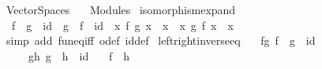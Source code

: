 %
\begin{isabellebody}%
%
%
\isadelimdocument
%
\endisadelimdocument
%
\isatagdocument
%
\isamarkuptrue%
%
\endisatagdocument
{\isafolddocument}%
%
\isadelimdocument
%
\endisadelimdocument
%
\isadelimtheory
%
\endisadelimtheory
%
\isatagtheory
{}\isamarkupfalse%
\ Vector{\isacharunderscore}{\kern0pt}Spaces\isanewline
\ \ \ Modules\isanewline
{}%
\endisatagtheory
{\isafoldtheory}%
%
\isadelimtheory
\isanewline
%
\endisadelimtheory
\isanewline
{}\isamarkupfalse%
\ isomorphism{\isacharunderscore}{\kern0pt}expand{\isacharcolon}{\kern0pt}\isanewline
\ \ {\isachardoublequoteopen}f\ {\isasymcirc}\ g\ {\isacharequal}{\kern0pt}\ id\ {\isasymand}\ g\ {\isasymcirc}\ f\ {\isacharequal}{\kern0pt}\ id\ {\isasymlongleftrightarrow}\ {\isacharparenleft}{\kern0pt}{\isasymforall}x{\isachardot}{\kern0pt}\ f\ {\isacharparenleft}{\kern0pt}g\ x{\isacharparenright}{\kern0pt}\ {\isacharequal}{\kern0pt}\ x{\isacharparenright}{\kern0pt}\ {\isasymand}\ {\isacharparenleft}{\kern0pt}{\isasymforall}x{\isachardot}{\kern0pt}\ g\ {\isacharparenleft}{\kern0pt}f\ x{\isacharparenright}{\kern0pt}\ {\isacharequal}{\kern0pt}\ x{\isacharparenright}{\kern0pt}{\isachardoublequoteclose}\isanewline
%
\isadelimproof
\ \ %
\endisadelimproof
%
\isatagproof
{}\isamarkupfalse%
\ {\isacharparenleft}{\kern0pt}simp\ add{\isacharcolon}{\kern0pt}\ fun{\isacharunderscore}{\kern0pt}eq{\isacharunderscore}{\kern0pt}iff\ o{\isacharunderscore}{\kern0pt}def\ id{\isacharunderscore}{\kern0pt}def{\isacharparenright}{\kern0pt}%
\endisatagproof
{\isafoldproof}%
%
\isadelimproof
\isanewline
%
\endisadelimproof
\isanewline
{}\isamarkupfalse%
\ left{\isacharunderscore}{\kern0pt}right{\isacharunderscore}{\kern0pt}inverse{\isacharunderscore}{\kern0pt}eq{\isacharcolon}{\kern0pt}\isanewline
\ \ \ fg{\isacharcolon}{\kern0pt}\ {\isachardoublequoteopen}f\ {\isasymcirc}\ g\ {\isacharequal}{\kern0pt}\ id{\isachardoublequoteclose}\isanewline
\ \ \ \ \ gh{\isacharcolon}{\kern0pt}\ {\isachardoublequoteopen}g\ {\isasymcirc}\ h\ {\isacharequal}{\kern0pt}\ id{\isachardoublequoteclose}\isanewline
\ \ \ {\isachardoublequoteopen}f\ {\isacharequal}{\kern0pt}\ h{\isachardoublequoteclose}\isanewline
%
\isadelimproof
%
\endisadelimproof
%
\isatagproof
{}\isamarkupfalse%
\ {\isacharminus}{\kern0pt}\isanewline
\ \ \isamarkupfalse%

\end{isabellebody}
